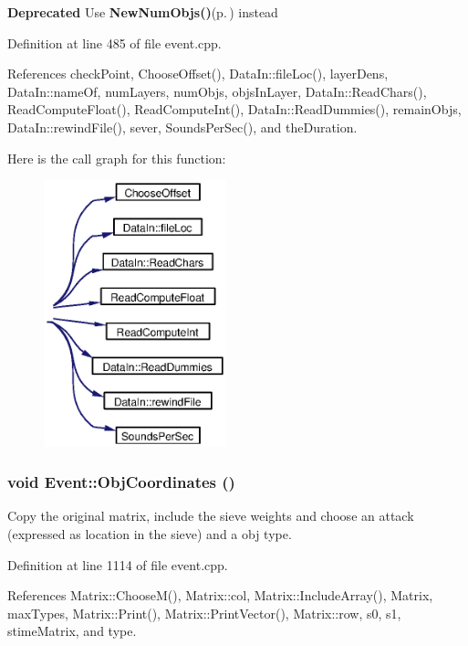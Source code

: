 \begin{Desc}
\item[{\bf Deprecated}]Use {\bf New\-Num\-Objs()}{\rm (p.\,\pageref{classEvent_a27})} instead \end{Desc}


Definition at line 485 of file event.cpp.

References check\-Point, Choose\-Offset(), Data\-In::file\-Loc(), layer\-Dens, Data\-In::name\-Of, num\-Layers, num\-Objs, objs\-In\-Layer, Data\-In::Read\-Chars(), Read\-Compute\-Float(), Read\-Compute\-Int(), Data\-In::Read\-Dummies(), remain\-Objs, Data\-In::rewind\-File(), sever, Sounds\-Per\-Sec(), and the\-Duration.

Here is the call graph for this function:\begin{figure}[H]
\begin{center}
\leavevmode
\includegraphics[width=150pt]{classEvent_a26_cgraph}
\end{center}
\end{figure}
\subsubsection{\setlength{\rightskip}{0pt plus 5cm}void Event::Obj\-Coordinates ()}\label{classEvent_a52}


Copy the original matrix, include the sieve weights and choose an attack (expressed as location in the sieve) and a obj type. 

Definition at line 1114 of file event.cpp.

References Matrix::Choose\-M(), Matrix::col, Matrix::Include\-Array(), Matrix, max\-Types, Matrix::Print(), Matrix::Print\-Vector(), Matrix::row, s0, s1, stime\-Matrix, and type.

